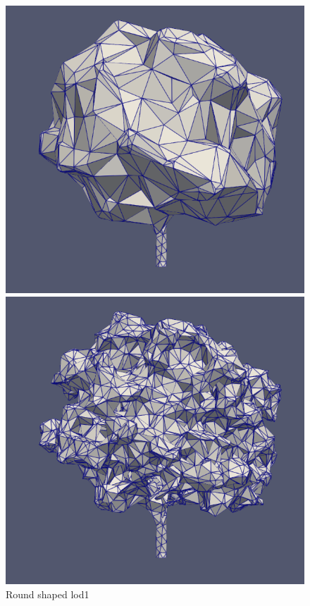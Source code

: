 \documentclass[12pt]{article}
\begin{document}
\begin{figure}[H]
    \centering
    \begin{minipage}{0.30\textwidth}
        \centering
        \includegraphics[width=1\textwidth]{images/tree-round_lod1.png}
        \caption{Round shaped lod1}
    \end{minipage}
    \begin{minipage}{0.30\textwidth}
        \centering
        \includegraphics[width=1\textwidth]{images/tree-round_lod2.png}

\end{minipage}
\end{figure}
\end{document}

